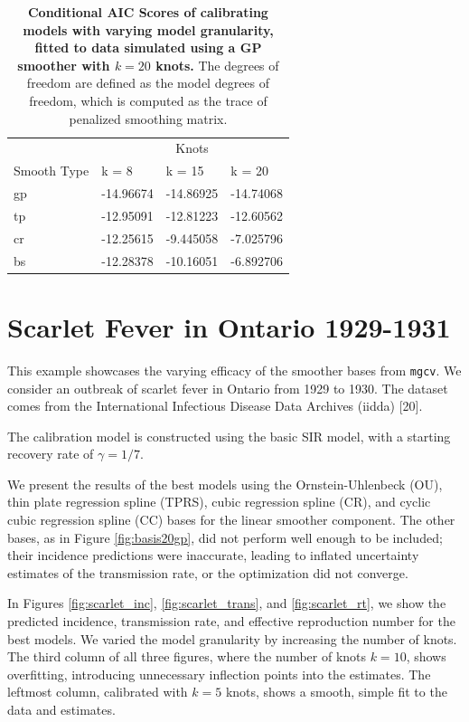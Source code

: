 \documentclass[
11pt, %
oneside, %
english, %
singlespacing, %
]{macthesis} %
\begin{document}
\begin{table}[!h]
\centering
\caption{\label{tab:aic-table-sim}\textbf{Conditional AIC Scores of calibrating models with varying model granularity, fitted to data simulated using a GP smoother with \(k=20\) knots.} The degrees of freedom are defined as the model degrees of freedom, which is computed as the trace of penalized smoothing matrix.}
\centering
\begin{tabular}[t]{llll}
\toprule
\multicolumn{1}{c}{ } & \multicolumn{3}{c}{Knots} \\
\cmidrule(l{3pt}r{3pt}){2-4}
Smooth Type & k = 8 & k = 15 & k = 20\\
\midrule
gp & -14.96674 & -14.86925 & -14.74068\\
tp & -12.95091 & -12.81223 & -12.60562\\
cr & -12.25615 & -9.445058 & -7.025796\\
bs & -12.28378 & -10.16051 & -6.892706\\
\bottomrule
\end{tabular}
\end{table}

\section{Scarlet Fever in Ontario 1929-1931}\label{scarlet}

This example showcases the varying efficacy of the smoother bases from \texttt{mgcv}. We consider an outbreak of scarlet fever in Ontario from 1929 to 1930. The dataset comes from the International Infectious Disease Data Archives (iidda) {[}20{]}.

The calibration model is constructed using the basic SIR model, with a starting recovery rate of \(\gamma = 1/7\).

We present the results of the best models using the Ornstein-Uhlenbeck (OU), thin plate regression spline (TPRS), cubic regression spline (CR), and cyclic cubic regression spline (CC) bases for the linear smoother component. The other bases, as in Figure \ref{fig:basis20gp}, did not perform well enough to be included; their incidence predictions were inaccurate, leading to inflated uncertainty estimates of the transmission rate, or the optimization did not converge.

In Figures \ref{fig:scarlet_inc}, \ref{fig:scarlet_trans}, and \ref{fig:scarlet_rt}, we show the predicted incidence, transmission rate, and effective reproduction number for the best models. We varied the model granularity by increasing the number of knots. The third column of all three figures, where the number of knots \(k=10\), shows overfitting, introducing unnecessary inflection points into the estimates. The leftmost column, calibrated with \(k=5\) knots, shows a smooth, simple fit to the data and estimates.
\end{document}
